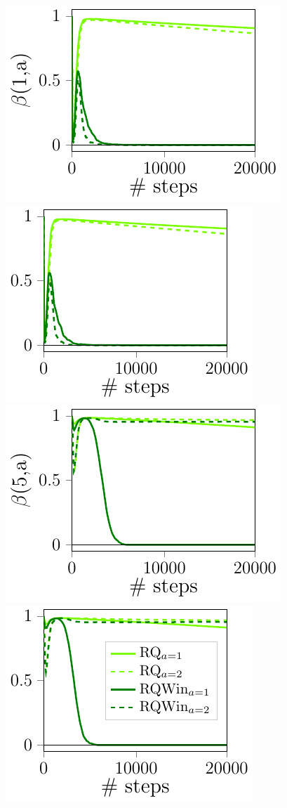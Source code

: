 \documentclass[portrait,a0paper,fontscale=0.312]{baposter}
\begin{document}
\begin{poster}
{\begin{minipage}{0.5\textwidth}
\end{minipage} %
%
\hfill
%
\begin{minipage}{0.5\textwidth}
  \includegraphics[scale=0.55]{./imgs/doubleChain/lrs1-1.pdf}
  \includegraphics[scale=0.55]{./imgs/doubleChain/lrs1-51.pdf}\\
  \includegraphics[scale=0.55]{./imgs/doubleChain/lrs5-1.pdf}
  \includegraphics[scale=0.55]{./imgs/doubleChain/lrs5-51.pdf}

\end{minipage}}
\end{poster}
\end{document}
